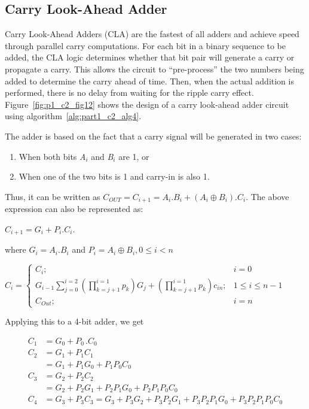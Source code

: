 \subsection{Carry Look-Ahead Adder}
Carry Look-Ahead Adders (CLA) are the fastest of all adders and achieve speed through parallel carry computations. For each bit in a binary sequence to be added, the CLA logic determines whether that bit pair will generate a carry or propagate a carry. This allows the circuit to ``pre-process'' the two numbers being added to determine the carry ahead of time. Then, when the actual addition is performed, there is no delay from waiting for the ripple carry effect. Figure~\ref{fig:p1_c2_fig12} shows the design of a carry look-ahead adder circuit using algorithm~\ref{alg:part1_c2_alg4}.

The adder is based on the fact that a carry signal will be generated in two cases: 
\begin{enumerate}
	\item When both bits {\it A${}_{i}$} and {\it B${}_{i}$} are 1, or
	\item  When one of the two bits is 1 and carry-in is also 1. 
\end{enumerate}

\noindent Thus, it can be written as
$C{}_{OUT} = C{}_{i + 1} = A{}_{i} . B{}_{i} + (A{}_{i}{\oplus } B{}_{i}) . C{}_{i}$.
\newline The above expression can also be represented as: 

$C{}_{i+1} = G{}_{i} + P{}_{i} . C{}_{i}$.

\noindent where  $G{}_{i} = A{}_{i} . B{}_{i}$ and $P{}_{i} = A_{i} \oplus B_{i} ,0 \le i < n$

$
C_i=\left\{\begin{matrix}
C_i;& i=0\\ 
G_{i-1}\sum_{j=0}^{i=2}\left ( \prod_{k=j+1}^{i=1}p_k \right )G_j+\left ( \prod_{k=j+1}^{i=1}p_k \right )c_{in};&1\le i\le n-1 \\ 
C_{Out};& i=n 
\end{matrix}\right.
$

\noindent Applying this to a {4}-bit adder, we get 



\begin{align*}
C{}_{1} &= G{}_{0} + P{}_{0\ }. C{}_{0}\\
%
C{}_{2} &= G{}_{1} + P{}_{1} C{}_{1}\\
%
&= G{}_{1} + P{}_{1} G{}_{0} + P{}_{1} P{}_{0} C{}_{0}\\
%
C{}_{3} &= G{}_{2} + P{}_{2} C{}_{2}\\
%
&= G{}_{2} + P{}_{2} G{}_{1} + P{}_{2} P{}_{1} G{}_{0} + P{}_{2} P{}_{1} P{}_{0} C{}_{0}\\
%
C{}_{4} &= G{}_{3} + P{}_{3} C{}_{3} = G{}_{3} + P{}_{3} G{}_{2} + P{}_{3} P{}_{2} G{}_{1} + P{}_{3} P{}_{2} P{}_{1} G{}_{0}  + P{}_{3} P{}_{2} P{}_{1} P{}_{0} C{}_{0}
\end{align*}

